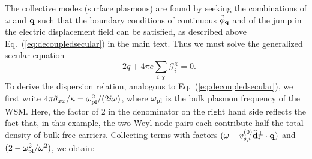 \documentclass[aps,twocolumn,prl,groupedaddress]{revtex4}
\newcommand{\be}{\begin{equation}}
\newcommand{\ee}{\end{equation}}
\renewcommand{\vec}[1]{{\bf #1}}
\begin{document}
The collective modes (surface plasmons) are found by seeking the combinations of $\omega$ and $\vec{q}$ such that the boundary conditions of continuous $\tilde\phi_{\vec{q}}$ and of the jump in the electric displacement field can be satisfied, as described above Eq.~(\ref{eq:decoupledsecular}) in the main text. 
Thus we must solve the generalized secular equation 
\be
- 2q + 4\pi e\sum_{i,\chi} \mathcal{G}^{\chi}_i = 0.
\ee
To derive the dispersion relation, analogous to Eq.~(\ref{eq:decoupledsecular}), we first write $ 4\pi\tilde{\sigma}_{xx}/\kappa =  \omega_{\rm pl}^2/(2i\omega)$, where $\omega_{\rm pl}$ is the bulk plasmon frequency of the WSM.
Here, the factor of 2 in the denominator on the right hand side reflects the fact that, in this example, the two Weyl node pairs each contribute half the total density of bulk free carriers.
Collecting terms with factors $(\omega - v_{s,i}^{(0)} \widehat{\vec{d}}_i^\perp  \cdot \vec q)$ and $(2- \omega_{\rm pl}^2/\omega^2)$, we obtain: 
\end{document}
